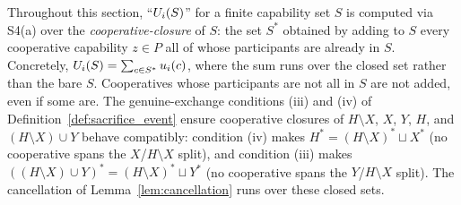 \begin{remark}
\label{rem:cooperative_closure_op}
Throughout this section, ``$U_i(S)$'' for a finite capability
set $S$ is computed via S4(a) over the
\emph{cooperative-closure} of $S$: the set $S^{*}$ obtained by
adding to $S$ every cooperative capability $z \in P$ all of
whose participants are already in $S$.  Concretely,
$U_i(S) = \sum_{c \in S^{*}} u_i(c)$, where the sum runs over
the closed set rather than the bare $S$.  Cooperatives whose
participants are not all in $S$ are not added, even if some are.
The genuine-exchange conditions (iii) and (iv) of
Definition~\ref{def:sacrifice_event} ensure cooperative
closures of $H \setminus X$, $X$, $Y$, $H$, and $(H \setminus
X) \cup Y$ behave compatibly: condition (iv) makes $H^{*} =
(H \setminus X)^{*} \sqcup X^{*}$ (no cooperative spans the
$X$/$H \setminus X$ split), and condition (iii) makes
$((H \setminus X) \cup Y)^{*} = (H \setminus X)^{*} \sqcup
Y^{*}$ (no cooperative spans the $Y$/$H \setminus X$ split).
The cancellation of Lemma~\ref{lem:cancellation} runs over
these closed sets.
\end{remark}

